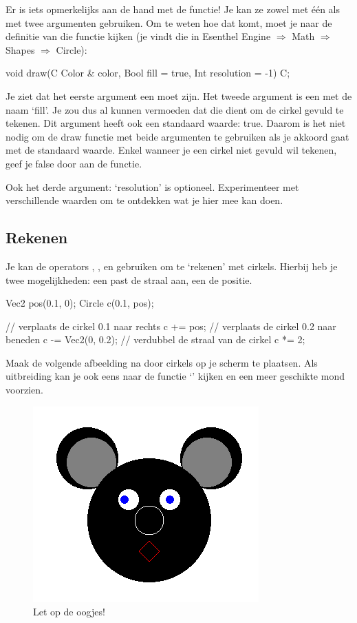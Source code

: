 Er is iets opmerkelijks aan de hand met de  functie! Je kan ze zowel met \'e\'en als met twee argumenten gebruiken. Om te weten hoe dat komt, moet je naar de definitie van die functie kijken (je vindt die in Esenthel Engine $\Rightarrow$ Math $\Rightarrow$ Shapes $\Rightarrow$ Circle):

\begin{code}
void draw(C Color & color, Bool fill = true, Int resolution = -1) C;
\end{code}

Je ziet dat het eerste argument een  moet zijn. Het tweede argument is een  met de naam `fill'. Je zou dus al kunnen vermoeden dat die dient om de cirkel gevuld te tekenen. Dit argument heeft ook een standaard waarde: true. Daarom is het niet nodig om de draw functie met beide argumenten te gebruiken als je akkoord gaat met de standaard waarde. Enkel wanneer je een cirkel niet gevuld wil tekenen, geef je false door aan de functie.


\begin{note}
Ook het derde argument: `resolution' is optioneel. Experimenteer met verschillende waarden om te ontdekken wat je hier mee kan doen.
\end{note}

\subsection{Rekenen}
Je kan de operators \eeOpp{+=}, \eeOpp{-=}, \eeOpp{/=} en \eeOpp{*=} gebruiken om te `rekenen' met cirkels. Hierbij heb je twee mogelijkheden: een  past de straal aan, een  de positie.

\begin{code}
Vec2 pos(0.1, 0);
Circle c(0.1, pos);

// verplaats de cirkel 0.1 naar rechts
c += pos;
// verplaats de cirkel 0.2 naar beneden
c -= Vec2(0, 0.2);
// verdubbel de straal van de cirkel
c *= 2;
\end{code}

\begin{exercise}
Maak de volgende afbeelding na door cirkels op je scherm te plaatsen. Als uitbreiding kan je ook eens naar de functie `' kijken en een meer geschikte mond voorzien.

\begin{figure}[h]
\centering
\includegraphics[width=0.4\linewidth]{images/circle_exercise.png}
\caption[]{Let op de oogjes!}
\label{fig:pos2D}
\end{figure}

\end{exercise}

